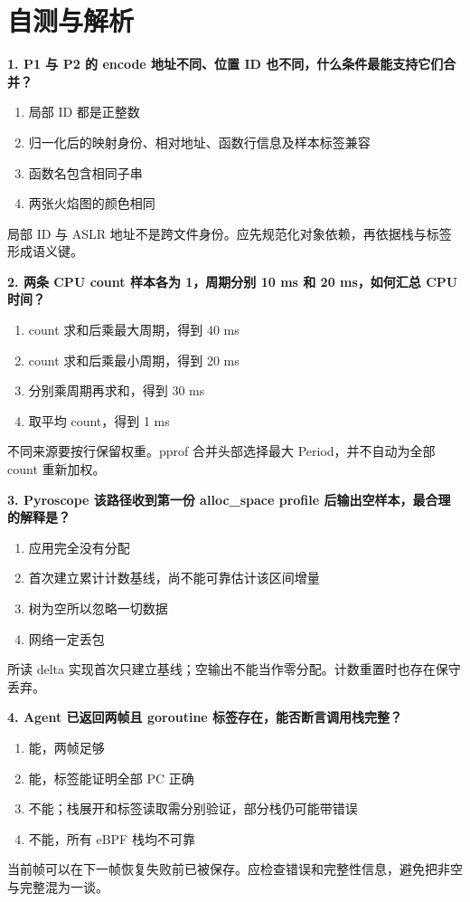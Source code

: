 \documentclass[UTF8,fontset=fandol,openany,11pt]{ctexbook}
\begin{document}
\section{自测与解析}
\noindent\textbf{1. P1 与 P2 的 encode 地址不同、位置 ID 也不同，什么条件最能支持它们合并？}
\begin{enumerate}[label=\Alph*.]
\item 局部 ID 都是正整数
\item 归一化后的映射身份、相对地址、函数行信息及样本标签兼容
\item 函数名包含相同子串
\item 两张火焰图的颜色相同
\end{enumerate}
局部 ID 与 ASLR 地址不是跨文件身份。应先规范化对象依赖，再依据栈与标签形成语义键。

\noindent\textbf{2. 两条 CPU count 样本各为 1，周期分别 10 ms 和 20 ms，如何汇总 CPU 时间？}
\begin{enumerate}[label=\Alph*.]
\item count 求和后乘最大周期，得到 40 ms
\item count 求和后乘最小周期，得到 20 ms
\item 分别乘周期再求和，得到 30 ms
\item 取平均 count，得到 1 ms
\end{enumerate}
不同来源要按行保留权重。pprof 合并头部选择最大 Period，并不自动为全部 count 重新加权。

\noindent\textbf{3. Pyroscope 该路径收到第一份 alloc\_space profile 后输出空样本，最合理的解释是？}
\begin{enumerate}[label=\Alph*.]
\item 应用完全没有分配
\item 首次建立累计计数基线，尚不能可靠估计该区间增量
\item 树为空所以忽略一切数据
\item 网络一定丢包
\end{enumerate}
所读 delta 实现首次只建立基线；空输出不能当作零分配。计数重置时也存在保守丢弃。

\noindent\textbf{4. Agent 已返回两帧且 goroutine 标签存在，能否断言调用栈完整？}
\begin{enumerate}[label=\Alph*.]
\item 能，两帧足够
\item 能，标签能证明全部 PC 正确
\item 不能；栈展开和标签读取需分别验证，部分栈仍可能带错误
\item 不能，所有 eBPF 栈均不可靠
\end{enumerate}
当前帧可以在下一帧恢复失败前已被保存。应检查错误和完整性信息，避免把非空与完整混为一谈。
\end{document}
